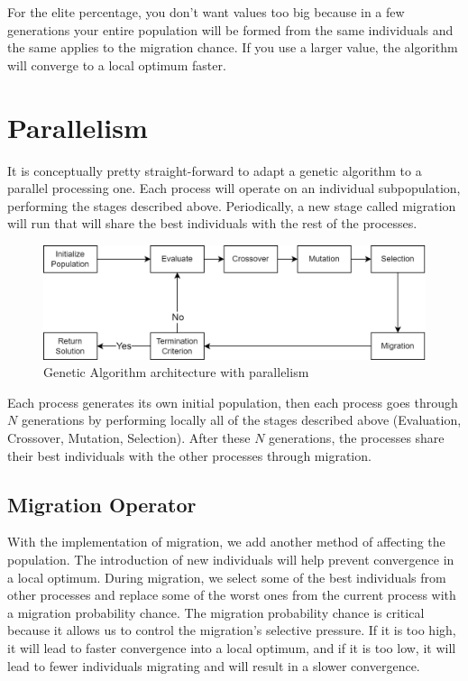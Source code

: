 \par
For the elite percentage, you don't want values too big because in a few generations your entire population will be formed from the same individuals and the same applies to the migration chance. If you use a larger value, the algorithm will converge to a local optimum faster.
\newpage
\section{Parallelism}
It is conceptually pretty straight-forward to adapt a genetic algorithm to a parallel processing one. Each process will operate on an individual subpopulation, performing the stages described above. Periodically, a new stage called migration will run that will share the best individuals with the rest of the processes.
\begin{figure}[ht]
\includegraphics[width=\textwidth]{images/ga_2.png}
\caption{Genetic Algorithm architecture with parallelism}
\end{figure}
\par
Each process generates its own initial population, then each process goes through $N$ generations by performing locally all of the stages described above (Evaluation, Crossover, Mutation, Selection). After these $N$ generations, the processes share their best individuals with the other processes through migration.
\subsection{Migration Operator}
With the implementation of migration, we add another method of affecting the population. The introduction of new individuals will help prevent convergence in a local optimum. During migration, we select some of the best individuals from other processes and replace some of the worst ones from the current process with a migration probability chance. The migration probability chance is critical because it allows us to control the migration's selective pressure. If it is too high, it will lead to faster convergence into a local optimum, and if it is too low, it will lead to fewer individuals migrating and will result in a slower convergence.
\newpage
